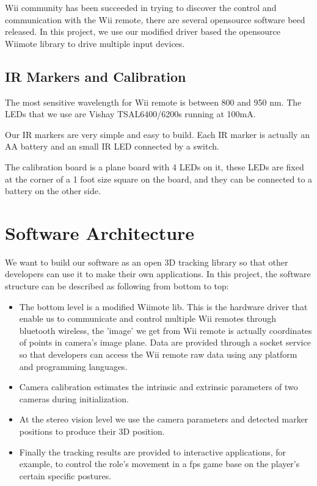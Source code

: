 \documentclass[10pt,twocolumn,letterpaper]{article}
\begin{document}
Wii community has been succeeded in trying 
to discover the control and communication with the Wii remote, 
there are several opensource software beed released.
In this project, we use our modified driver based the 
opensource Wiimote library to drive multiple input devices.

\subsection{IR Markers and Calibration}
The most sensitive wavelength for Wii remote is between 800 and 950 nm.
The LEDs that we use are Vishay TSAL6400/6200s running at 100mA.

Our IR markers are very simple and easy to build. 
Each IR marker is actually an AA battery and an small IR LED
connected by a switch. 

The calibration board is a plane board 
with 4 LEDs on it, these LEDs are fixed 
at the corner of a 1 foot size square on the board, 
and they can be connected to a battery on the other side.

\section{Software Architecture}
We want to build our software as an open 3D tracking library so that 
other developers can use it to make their own applications. In this project, 
the software structure can be described as following from bottom to top:
\begin{itemize}
\item The bottom level is a modified Wiimote lib. This is the hardware driver that enable
us to communicate and control multiple Wii remotes through bluetooth wireless, 
the 'image' we get from Wii remote is actually coordinates of points
in camera's image plane. Data are provided through a socket service so that
developers can access the Wii remote raw data using any platform and programming languages.
\item Camera calibration estimates the intrinsic and extrinsic parameters 
of two cameras during initialization.
\item At the stereo vision level we use the camera parameters and detected marker positions
to produce their 3D position.
\item Finally the tracking results are provided to interactive applications, 
for example, to control the role's movement in a fps game base on 
the player's certain specific postures.
\end{itemize}
\end{document}
